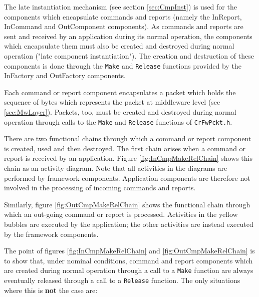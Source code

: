 \documentclass{pnp_article}
\begin{document}
The late instantiation mechanism (see section \ref{sec:CmpInst}) is used for the components which encapsulate commands and reports (namely the InReport, InCommand and OutComponent components). As commands and reports are sent and received by an application during its normal operation, the components which encapsulate them must also be created and destroyed during normal operation ("late component instantiation"). The creation and destruction of these components is done through the \texttt{Make} and \texttt{Release} functions provided by the InFactory and OutFactory components.

Each command or report component encapsulates a packet which holds the sequence of bytes which represents the packet at middleware level (see \ref{sec:MwLayer}). Packets, too, must be created and destroyed during normal operation through calls to the \texttt{Make} and \texttt{Release} functions of \texttt{CrFwPckt.h}.

There are two functional chains through which a command or report component is created, used and then destroyed. The first chain arises when a command or report is received by an application. Figure \ref{fig:InCmpMakeRelChain} shows this chain as an activity diagram. Note that all activities in the diagrams are performed by framework components. Application components are therefore not involved in the processing of incoming commands and reports.

Similarly, figure \ref{fig:OutCmpMakeRelChain} shows the functional chain through which an out-going command or report is processed. Activities in the yellow bubbles are executed by the application; the other activities are instead executed by the framework components. 

The point of figures \ref{fig:InCmpMakeRelChain} and \ref{fig:OutCmpMakeRelChain} is to show that, under nominal conditions, command and report components which are created during normal operation through a call to a \texttt{Make} function are always eventually released through a call to a \texttt{Release} function. The only situations where this is \textbf{not} the case are:
\end{document}
